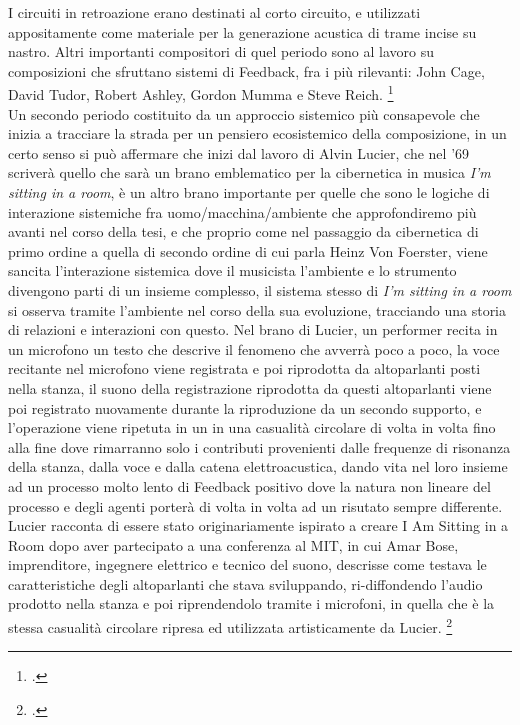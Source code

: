 I circuiti in retroazione erano destinati al corto circuito,
e utilizzati appositamente come materiale per la generazione acustica
di trame incise su nastro.
Altri importanti compositori di quel periodo sono al lavoro su composizioni
che sfruttano sistemi di Feedback, fra i più rilevanti:
John Cage, David Tudor, Robert Ashley, Gordon Mumma e Steve Reich. \footcite{sanfilippovallefeedsys} \\
Un secondo periodo costituito da un approccio sistemico più consapevole
che inizia a tracciare la strada per un pensiero ecosistemico della composizione,
in un certo senso si può affermare che inizi dal lavoro
di Alvin Lucier, che nel '69 scriverà quello che sarà un brano emblematico per
la cibernetica in musica \textit{I'm sitting in a room},
è un altro brano importante per quelle che sono
le logiche di interazione sistemiche fra uomo/macchina/ambiente che approfondiremo 
più avanti nel corso della tesi,
e che proprio come nel passaggio da cibernetica di primo 
ordine a quella di secondo ordine di cui parla Heinz Von Foerster, 
viene sancita l'interazione sistemica dove il musicista l'ambiente e lo strumento
divengono parti di un insieme complesso,
il sistema stesso di \textit{I'm sitting in a room} si osserva tramite l'ambiente 
nel corso della sua evoluzione, tracciando una storia di relazioni e interazioni 
con questo.
Nel brano di Lucier, un performer
recita in un microfono un testo che descrive il fenomeno che avverrà poco a poco,
la voce recitante nel microfono viene registrata e poi riprodotta da altoparlanti
posti nella stanza, il suono della registrazione riprodotta da questi altoparlanti
viene poi registrato nuovamente durante la riproduzione da un secondo supporto, e l'operazione
viene ripetuta in un in una casualità circolare di volta in volta
fino alla fine dove rimarranno
solo i contributi provenienti dalle frequenze di risonanza della stanza,
dalla voce e dalla catena elettroacustica,
dando vita nel loro insieme ad un processo molto lento di Feedback positivo dove
la natura non lineare del processo e degli agenti porterà di volta in volta ad un risutato
sempre differente.
Lucier racconta di essere stato originariamente ispirato
a creare I Am Sitting in a Room dopo aver partecipato a una conferenza al MIT,
in cui Amar Bose, imprenditore, ingegnere elettrico e tecnico del suono,
descrisse come testava le caratteristiche degli altoparlanti
che stava sviluppando, ri-diffondendo l'audio prodotto nella stanza e poi
riprendendolo tramite i microfoni, in quella che è la stessa casualità
circolare ripresa ed utilizzata artisticamente da Lucier. \footcite{lucierbose}
